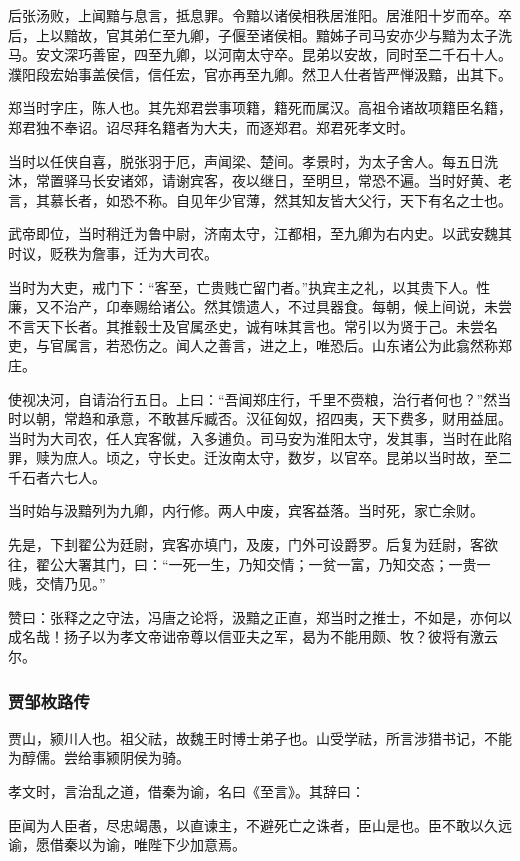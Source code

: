 \documentclass[]{article}
\begin{document}
后张汤败，上闻黯与息言，抵息罪。令黯以诸侯相秩居淮阳。居淮阳十岁而卒。卒后，上以黯故，官其弟仁至九卿，子偃至诸侯相。黯姊子司马安亦少与黯为太子洗马。安文深巧善宦，四至九卿，以河南太守卒。昆弟以安故，同时至二千石十人。濮阳段宏始事盖侯信，信任宏，官亦再至九卿。然卫人仕者皆严惮汲黯，出其下。

郑当时字庄，陈人也。其先郑君尝事项籍，籍死而属汉。高祖令诸故项籍臣名籍，郑君独不奉诏。诏尽拜名籍者为大夫，而逐郑君。郑君死孝文时。

当时以任侠自喜，脱张羽于厄，声闻梁、楚间。孝景时，为太子舍人。每五日洗沐，常置驿马长安诸郊，请谢宾客，夜以继日，至明旦，常恐不遍。当时好黄、老言，其慕长者，如恐不称。自见年少官薄，然其知友皆大父行，天下有名之士也。

武帝即位，当时稍迁为鲁中尉，济南太守，江都相，至九卿为右内史。以武安魏其时议，贬秩为詹事，迁为大司农。

当时为大吏，戒门下：``客至，亡贵贱亡留门者。''执宾主之礼，以其贵下人。性廉，又不治产，卬奉赐给诸公。然其馈遗人，不过具器食。每朝，候上间说，未尝不言天下长者。其推毂士及官属丞史，诚有味其言也。常引以为贤于己。未尝名吏，与官属言，若恐伤之。闻人之善言，进之上，唯恐后。山东诸公为此翕然称郑庄。

使视决河，自请治行五日。上曰：``吾闻郑庄行，千里不赍粮，治行者何也？''然当时以朝，常趋和承意，不敢甚斥臧否。汉征匈奴，招四夷，天下费多，财用益屈。当时为大司农，任人宾客僦，入多逋负。司马安为淮阳太守，发其事，当时在此陷罪，赎为庶人。顷之，守长史。迁汝南太守，数岁，以官卒。昆弟以当时故，至二千石者六七人。

当时始与汲黯列为九卿，内行修。两人中废，宾客益落。当时死，家亡余财。

先是，下刲翟公为廷尉，宾客亦填门，及废，门外可设爵罗。后复为廷尉，客欲往，翟公大署其门，曰：``一死一生，乃知交情；一贫一富，乃知交态；一贵一贱，交情乃见。''

赞曰：张释之之守法，冯唐之论将，汲黯之正直，郑当时之推士，不如是，亦何以成名哉！扬子以为孝文帝诎帝尊以信亚夫之军，曷为不能用颇、牧？彼将有激云尔。

\hypertarget{header-n4232}{%
\subsubsection{贾邹枚路传}\label{header-n4232}}

贾山，颍川人也。祖父祛，故魏王时博士弟子也。山受学祛，所言涉猎书记，不能为醇儒。尝给事颍阴侯为骑。

孝文时，言治乱之道，借秦为谕，名曰《至言》。其辞曰：

臣闻为人臣者，尽忠竭愚，以直谏主，不避死亡之诛者，臣山是也。臣不敢以久远谕，愿借秦以为谕，唯陛下少加意焉。
\end{document}
